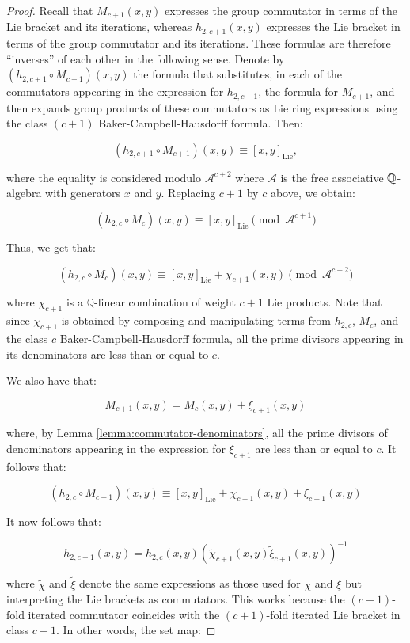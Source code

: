 \begin{proof}
  Recall that $M_{c+1}(x,y)$ expresses the group commutator in terms
  of the Lie bracket and its iterations, whereas $h_{2,c + 1}(x,y)$
  expresses the Lie bracket in terms of the group commutator and its
  iterations. These formulas are therefore ``inverses'' of each other
  in the following sense. Denote by $(h_{2,c + 1} \circ M_{c +
    1})(x,y)$ the formula that substitutes, in each of the commutators
  appearing in the expression for $h_{2,c + 1}$, the formula for
  $M_{c+1}$, and then expands group products of these commutators as
  Lie ring expressions using the class $(c + 1)$
  Baker-Campbell-Hausdorff formula. Then:

  $$(h_{2,c+1} \circ M_{c+1})(x,y) \equiv [x,y]_{\text{Lie}},$$

  where the equality is considered modulo $\mathcal{A}^{c+2}$ where
  $\mathcal{A}$ is the free associative $\mathbb{Q}$-algebra with generators
  $x$ and $y$. Replacing $c + 1$ by $c$ above, we obtain:

  $$(h_{2,c} \circ M_c)(x,y) \equiv [x,y]_{\text{Lie}} \pmod{\mathcal{A}^{c+1}}$$

  Thus, we get that:

  $$(h_{2,c} \circ M_{c})(x,y) \equiv [x,y]_{\text{Lie}} + \chi_{c+1}(x,y) \pmod{\mathcal{A}^{c+2}}$$
 
 where $\chi_{c+1}$ is a $\mathbb{Q}$-linear combination of weight $c
 + 1$ Lie products. Note that since $\chi_{c+1}$ is obtained by
 composing and manipulating terms from $h_{2,c}$, $M_{c}$, and the
 class $c$ Baker-Campbell-Hausdorff formula, all the prime divisors
 appearing in its denominators are less than or equal to $c$.

 We also have that:

 $$M_{c+1}(x,y) = M_c(x,y) + \xi_{c+1}(x,y)$$

 where, by Lemma \ref{lemma:commutator-denominators}, all the prime
 divisors of denominators appearing in the expression for $\xi_{c+1}$ are
 less than or equal to $c$. It follows that:

 $$(h_{2,c} \circ M_{c+1})(x,y) \equiv [x,y]_{\text{Lie}} + \chi_{c+1}(x,y) + \xi_{c+1}(x,y)$$

 It now follows that:

 $$h_{2,c+1}(x,y) = h_{2,c}(x,y)(\tilde{\chi}_{c+1}(x,y)\tilde{\xi}_{c+1}(x,y))^{-1}$$

 where $\tilde{\chi}$ and $\tilde{\xi}$ denote the same expressions as
 those used for $\chi$ and $\xi$ but interpreting the Lie brackets as
 commutators. This works because the $(c+1)$-fold iterated commutator
 coincides with the $(c + 1)$-fold iterated Lie bracket in class $c +
 1$. In other words, the set map:


\end{proof}
